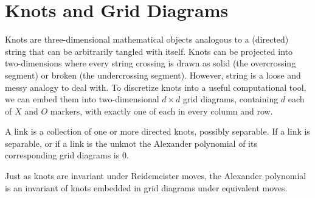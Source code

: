 \section{Knots and Grid Diagrams}

Knots are three-dimensional mathematical objects analogous to a (directed) string
that can be arbitrarily tangled with itself. Knots can be projected into
two-dimensions where every string crossing is drawn as solid (the overcrossing
segment) or broken (the undercrossing segment). However, string is a loose
and messy analogy to deal with. To discretize knots into a useful computational
tool, we can embed them into two-dimensional $d \times d$ grid diagrams,
containing $d$ each of $X$ and $O$ markers, with exactly one of each in every
column and row.

A link is a collection of
one or more directed knots, possibly separable.
If a link is separable, or if a link is the unknot the Alexander polynomial of
its corresponding grid diagrams is 0.

Just as knots are invariant under Reidemeister moves,
the Alexander polynomial is an invariant of knots embedded in grid diagrams
under equivalent moves.
